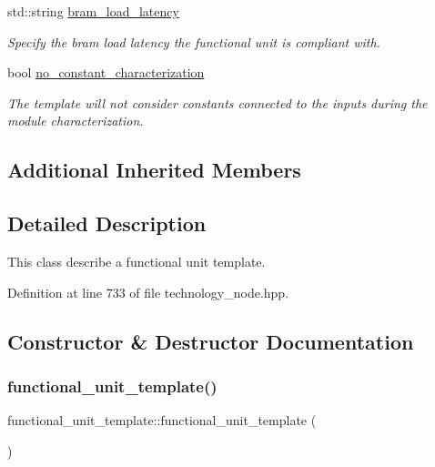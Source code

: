 \begin{DoxyCompactItemize}
std\+::string \hyperlink{structfunctional__unit__template_a5b26fda07926bc6ba68ab947bbae1274}{bram\+\_\+load\+\_\+latency}
\begin{DoxyCompactList}\small\item\em Specify the bram load latency the functional unit is compliant with. \end{DoxyCompactList}\item 
bool \hyperlink{structfunctional__unit__template_af2d438fef9b54228ee23e0a85279a6fa}{no\+\_\+constant\+\_\+characterization}
\begin{DoxyCompactList}\small\item\em The template will not consider constants connected to the inputs during the module characterization. \end{DoxyCompactList}\end{DoxyCompactItemize}
\subsection*{Additional Inherited Members}


\subsection{Detailed Description}
This class describe a functional unit template. 

Definition at line 733 of file technology\+\_\+node.\+hpp.



\subsection{Constructor \& Destructor Documentation}
\mbox{\label{structfunctional__unit__template_aaca95387a7e1504f7de69bc26b73b090}} 
\subsubsection{\texorpdfstring{functional\+\_\+unit\+\_\+template()}{functional\_unit\_template()}\hspace{0.1cm}{\footnotesize\ttfamily [1/2]}}
{\footnotesize\ttfamily functional\+\_\+unit\+\_\+template\+::functional\+\_\+unit\+\_\+template (\begin{DoxyParamCaption}{ }\end{DoxyParamCaption})}



